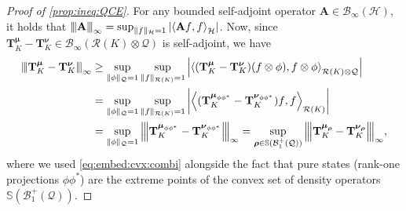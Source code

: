 \documentclass[noinfoline]{imsart}\setcounter{tocdepth}{2}
\renewcommand{\b}[1]{\mathbb{#1}} %
\newcommand{\m}[1]{\mathbf{#1}} %
\renewcommand{\c}[1]{\mathcal{#1}} %
\newcommand{\mb}[1]{\boldsymbol{#1}} %
\newcommand{\vertiii}[1]{{\left\vert\kern-0.25ex\left\vert\kern-0.25ex\left\vert #1 
    \right\vert\kern-0.25ex\right\vert\kern-0.25ex\right\vert}} %
\newcommand{\innpr}[2]{{\left\langle {#1},{#2}\right\rangle}} %
\theoremstyle{plain}
\begin{document}
\begin{appendix}
\begin{proof}[Proof of \cref{prop:ineq:QCE}]
For any bounded self-adjoint operator $\m{A} \in \c{B}_{\infty}(\c{H})$, it holds that $\vertiii{\m{A}}_{\infty} = \sup_{\|f\|_{\c{H}}=1} \left| \innpr{\m{A} f}{f}_{\c{H}} \right|$. Now, since $\m{T}_{K}^{\mb{\mu}} - \m{T}_{K}^{\mb{\nu}} \in \c{B}_{\infty}(\c{R}(K) \otimes \c{Q})$ is self-adjoint, we have
\begin{align*}
    \vertiii{\m{T}_{K}^{\mb{\mu}} - \m{T}_{K}^{\mb{\nu}}}_{\infty} &\ge \sup_{\|\phi\|_{\c{Q}}=1} \sup_{\|f\|_{\c{R}(K)}=1} \left| \innpr{(\m{T}_{K}^{\mb{\mu}} - \m{T}_{K}^{\mb{\nu}}) (f \otimes \phi)}{f \otimes \phi}_{\c{R}(K) \otimes \c{Q}} \right| \\
    &= \sup_{\|\phi\|_{\c{Q}}=1} \sup_{\|f\|_{\c{R}(K)}=1} \left| \innpr{(\m{T}_{K}^{\mb{\mu}_{\phi \phi^{*}}} - \m{T}_{K}^{\mb{\nu}_{\phi \phi^{*}}}) f}{f}_{\c{R}(K)} \right| \\
    &= \sup_{\|\phi\|_{\c{Q}}=1} \vertiii{\m{T}_{K}^{\mb{\mu}_{\phi \phi^{*}}} - \m{T}_{K}^{\mb{\nu}_{\phi \phi^{*}}}}_{\infty} = \sup_{\mb{\rho} \in \b{S}(\c{B}_{1}^{+}(\c{Q}))} \vertiii{\m{T}_{K}^{\mb{\mu}_{\mb{\rho}}} - \m{T}_{K}^{\mb{\nu}_{\mb{\rho}}}}_{\infty},
\end{align*}
where we used \eqref{eq:embed:cvx:combi} alongside the fact that pure states (rank-one projections $\phi\phi^*$) are the extreme points of the convex set of density operators $\b{S}(\c{B}_{1}^{+}(\c{Q}))$. 
\end{proof}



\end{appendix}
\end{document}
